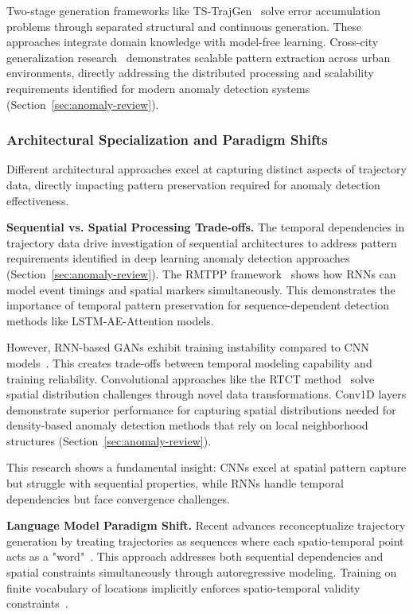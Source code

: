 \documentclass[runningheads]{llncs}
\begin{document}
Two-stage generation frameworks like TS-TrajGen~\cite{jiangContinuousTrajectoryGeneration2023} solve error accumulation problems through separated structural and continuous generation. These approaches integrate domain knowledge with model-free learning. Cross-city generalization research~\cite{wangGTGGeneralizableTrajectory2025} demonstrates scalable pattern extraction across urban environments, directly addressing the distributed processing and scalability requirements identified for modern anomaly detection systems (Section~\ref{sec:anomaly-review}).

\subsubsection{Architectural Specialization and Paradigm Shifts}

Different architectural approaches excel at capturing distinct aspects of trajectory data, directly impacting pattern preservation required for anomaly detection effectiveness.

\textbf{Sequential vs. Spatial Processing Trade-offs.} The temporal dependencies in trajectory data drive investigation of sequential architectures to address pattern requirements identified in deep learning anomaly detection approaches (Section~\ref{sec:anomaly-review}). The RMTPP framework~\cite{duRecurrentMarkedTemporal2016} shows how RNNs can model event timings and spatial markers simultaneously. This demonstrates the importance of temporal pattern preservation for sequence-dependent detection methods like LSTM-AE-Attention models.

However, RNN-based GANs exhibit training instability compared to CNN models~\cite{merhiSyntheticTrajectoryGeneration2024}. This creates trade-offs between temporal modeling capability and training reliability. Convolutional approaches like the RTCT method~\cite{merhiSyntheticTrajectoryGeneration2024} solve spatial distribution challenges through novel data transformations. Conv1D layers demonstrate superior performance for capturing spatial distributions needed for density-based anomaly detection methods that rely on local neighborhood structures (Section~\ref{sec:anomaly-review}).

This research shows a fundamental insight: CNNs excel at spatial pattern capture but struggle with sequential properties, while RNNs handle temporal dependencies but face convergence challenges.

\textbf{Language Model Paradigm Shift.} Recent advances reconceptualize trajectory generation by treating trajectories as sequences where each spatio-temporal point acts as a "word"~\cite{zhangEndtoendTrajectoryGeneration2025}. This approach addresses both sequential dependencies and spatial constraints simultaneously through autoregressive modeling. Training on finite vocabulary of locations implicitly enforces spatio-temporal validity constraints~\cite{kongMobilityTrajectoryGeneration2023}.
\end{document}
